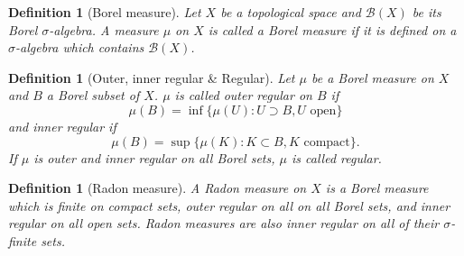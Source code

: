 \documentclass[11pt, letter]{book}
\newtheorem{definition}[theorem]{Definition}
\newcommand{\lp}{\left(}
\newcommand{\rp}{\right)}
\begin{document}
\begin{definition}[Borel measure]
Let $X$ be a topological space and $\mathcal{B}(X)$ be its Borel $\sigma$-algebra. A measure $\mu$ on $X$ is called a Borel measure if it is defined on a $\sigma$-algebra which contains $\mathcal{B}(X)$.
\end{definition}

\begin{definition}[Outer, inner regular \& Regular]
Let $\mu$ be a Borel measure on $X$ and $B$ a Borel subset of $X$. $\mu$ is called outer regular on $B$ if
\begin{equation*}
    \mu(B) = \inf \{ \mu(U) : U \supset B, U \text{ open} \}
\end{equation*}
and inner regular if
\begin{equation*}
    \mu(B) = \sup \{ \mu(K) : K \subset B, K \text{ compact} \}.
\end{equation*}
If $\mu$ is outer and inner regular on all Borel sets, $\mu$ is called regular.
\end{definition}

\begin{definition}[Radon measure]
A Radon measure on $X$ is a Borel measure which is finite on compact sets, outer regular on all on all Borel sets, and inner regular on all open sets. Radon measures are also inner regular on all of their $\sigma$-finite sets.
\end{definition}











\end{document}

